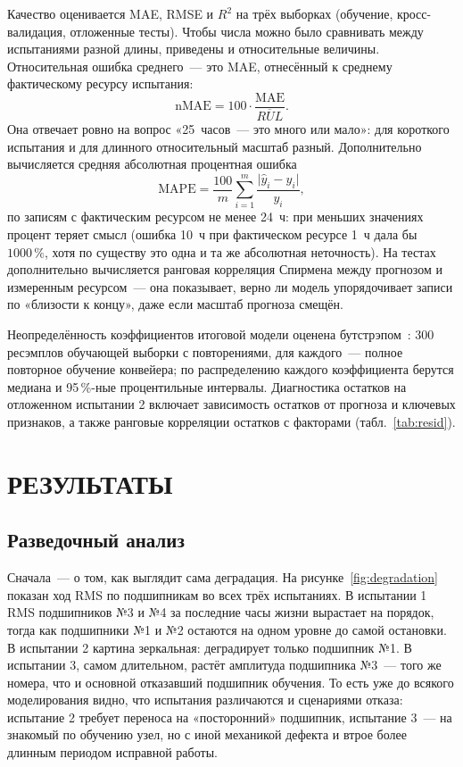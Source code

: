 \documentclass[14pt,a4paper]{extarticle}
\begin{document}
Качество оценивается MAE, RMSE и $R^2$ на трёх выборках (обучение,
кросс-валидация, отложенные тесты). Чтобы числа можно было сравнивать
между испытаниями разной длины, приведены и относительные величины.
Относительная ошибка среднего~--- это MAE, отнесённый к среднему
фактическому ресурсу испытания:
\begin{equation}
\mathrm{nMAE} = 100 \cdot \frac{\mathrm{MAE}}{\overline{RUL}}.
\label{eq:nmae}
\end{equation}
Она отвечает ровно на вопрос «25~часов~--- это много или мало»: для
короткого испытания и для длинного относительный масштаб разный.
Дополнительно вычисляется средняя абсолютная процентная ошибка
\begin{equation}
\mathrm{MAPE} = \frac{100}{m}\sum_{i=1}^{m}
\frac{\lvert \hat{y}_i - y_i \rvert}{y_i},
\label{eq:mape}
\end{equation}
по записям с фактическим ресурсом не менее 24~ч: при меньших значениях
процент теряет смысл (ошибка 10~ч при фактическом ресурсе 1~ч дала бы
$1000\,\%$, хотя по существу это одна и та же абсолютная неточность).
На тестах дополнительно вычисляется ранговая корреляция Спирмена между
прогнозом и измеренным ресурсом~--- она показывает, верно ли модель
упорядочивает записи по «близости к концу», даже если масштаб прогноза
смещён.

Неопределённость коэффициентов итоговой модели оценена бутстрэпом~\cite{efron}:
300 ресэмплов обучающей выборки с повторениями, для каждого~--- полное
повторное обучение конвейера; по распределению каждого коэффициента берутся
медиана и 95\,\%-ные процентильные интервалы. Диагностика остатков
на отложенном испытании 2 включает зависимость остатков от прогноза
и ключевых признаков, а также ранговые корреляции остатков с факторами
(табл.~\ref{tab:resid}).

\section{РЕЗУЛЬТАТЫ}

\subsection{Разведочный анализ}

Сначала~--- о том, как выглядит сама деградация. На
рисунке~\ref{fig:degradation} показан ход RMS по подшипникам во всех трёх
испытаниях. В испытании 1 RMS подшипников №3 и №4 за последние часы жизни
вырастает на порядок, тогда как подшипники №1 и №2 остаются на одном уровне
до самой остановки. В испытании 2 картина зеркальная: деградирует только
подшипник №1. В испытании 3, самом длительном, растёт амплитуда подшипника
№3~--- того же номера, что и основной отказавший подшипник обучения.
То есть уже до всякого моделирования видно, что испытания различаются
и сценариями отказа: испытание 2 требует переноса на «посторонний»
подшипник, испытание 3~--- на знакомый по обучению узел, но с иной
механикой дефекта и втрое более длинным периодом исправной работы.
\end{document}
